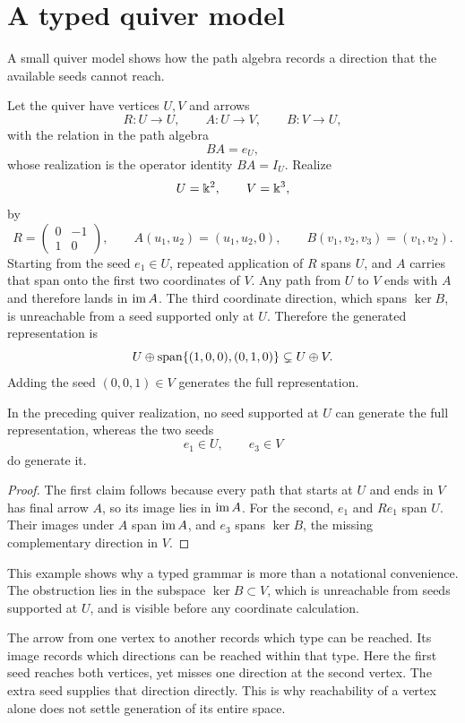 \section{A typed quiver model}

A small quiver model shows how the path algebra records a direction that the available seeds cannot reach.

Let the quiver have vertices $U,V$ and arrows
\[
R:U\to U,
\qquad
A:U\to V,
\qquad
B:V\to U,
\]
with the relation in the path algebra
\[
BA=e_U,
\]
whose realization is the operator identity $BA=I_U$.
Realize
\[
U=\Bbbk^2,
\qquad
V=\Bbbk^3,
\]
by
\[
R=
\begin{pmatrix}0&-1\\1&0\end{pmatrix},
\qquad
A(u_1,u_2)=(u_1,u_2,0),
\qquad
B(v_1,v_2,v_3)=(v_1,v_2).
\]
Starting from the seed $e_1\in U$, repeated application of $R$ spans $U$, and $A$ carries that span onto the first two coordinates of $V$. Any path from $U$ to $V$ ends with $A$ and therefore lands in $\operatorname{im} A$. The third coordinate direction, which spans $\ker B$, is unreachable from a seed supported only at $U$. Therefore the generated representation is
\[
U\oplus\operatorname{span}\{(1,0,0),(0,1,0)\}
\subsetneq U\oplus V.
\]
Adding the seed $(0,0,1)\in V$ generates the full representation.

\begin{proposition}
\label{prop:typed-reachability}
In the preceding quiver realization, no seed supported at $U$ can generate the full representation, whereas the two seeds
\[
e_1\in U,
\qquad
e_3\in V
\]
do generate it.
\end{proposition}

\begin{proof}
The first claim follows because every path that starts at $U$ and ends in $V$ has final arrow $A$, so its image lies in $\operatorname{im} A$. For the second, $e_1$ and $Re_1$ span $U$. Their images under $A$ span $\operatorname{im} A$, and $e_3$ spans $\ker B$, the missing complementary direction in $V$.
\end{proof}

This example shows why a typed grammar is more than a notational convenience. The obstruction lies in the subspace $\ker B\subset V$, which is unreachable from seeds supported at $U$, and is visible before any coordinate calculation.

The arrow from one vertex to another records which type can be reached. Its image records which directions can be reached within that type. Here the first seed reaches both vertices, yet misses one direction at the second vertex. The extra seed supplies that direction directly. This is why reachability of a vertex alone does not settle generation of its entire space.

